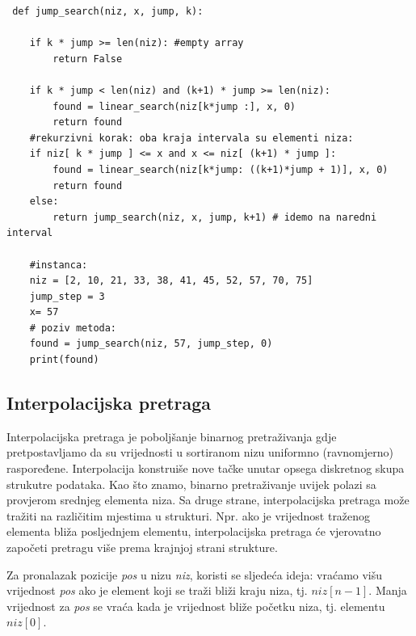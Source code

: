  \begin{verbatim}
 def jump_search(niz, x, jump, k):
 
 	if k * jump >= len(niz): #empty array
 		return False
 
 	if k * jump < len(niz) and (k+1) * jump >= len(niz): 
 		found = linear_search(niz[k*jump :], x, 0)
 		return found
 	#rekurzivni korak: oba kraja intervala su elementi niza: 
 	if niz[ k * jump ] <= x and x <= niz[ (k+1) * jump ]:
 		found = linear_search(niz[k*jump: ((k+1)*jump + 1)], x, 0)
 		return found
 	else:
 		return jump_search(niz, x, jump, k+1) # idemo na naredni interval
 
 	#instanca:
 	niz = [2, 10, 21, 33, 38, 41, 45, 52, 57, 70, 75]
 	jump_step = 3
 	x= 57
 	# poziv metoda:
 	found = jump_search(niz, 57, jump_step, 0)
 	print(found) 
 \end{verbatim}

\subsection{Interpolacijska pretraga}


 Interpolacijska pretraga je poboljšanje  binarnog pretraživanja   gdje pretpostavljamo da su vrijednosti u sortiranom nizu uniformno (ravnomjerno) raspoređene. Interpolacija konstruiše nove tačke   unutar opsega diskretnog skupa strukutre podataka. Kao što znamo, binarno pretraživanje uvijek polazi sa provjerom srednjeg elementa niza. Sa druge strane, interpolacijska pretraga može tražiti na različitim mjestima u strukturi. Npr. ako je vrijednost traženog elementa  bliža posljednjem elementu, interpolacijska pretraga će vjerovatno započeti pretragu više prema krajnjoj strani strukture.
  
  Za pronalazak pozicije  \emph{pos} u nizu \emph{niz}, koristi se sljedeća ideja: vraćamo višu vrijednost \emph{pos} ako je element koji se traži bliži kraju niza, tj. $niz[n-1]$. Manja vrijednost za \emph{pos} se vraća kada je vrijednost bliže početku niza, tj. elementu $niz[0]$. 
  
